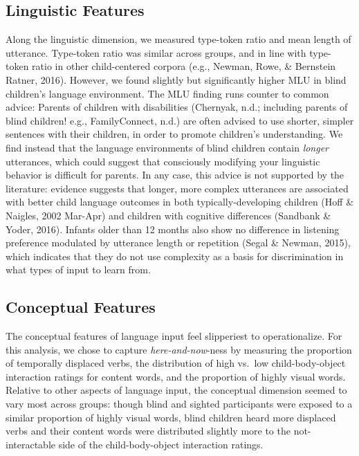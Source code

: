 \documentclass[
  man,floatsintext]{apa6}
\begin{document}
\hypertarget{linguistic-features-2}{%
\subsection{Linguistic Features}\label{linguistic-features-2}}

Along the linguistic dimension, we measured type-token ratio and mean length of utterance. Type-token ratio was similar across groups, and in line with type-token ratio in other child-centered corpora (e.g., Newman, Rowe, \& Bernstein Ratner, 2016). However, we found slightly but significantly higher MLU in blind children's language environment. The MLU finding runs counter to common advice: Parents of children with disabilities (Chernyak, n.d.; including parents of blind children! e.g., FamilyConnect, n.d.) are often advised to use shorter, simpler sentences with their children, in order to promote children's understanding. We find instead that the language environments of blind children contain \emph{longer} utterances, which could suggest that consciously modifying your linguistic behavior is difficult for parents. In any case, this advice is not supported by the literature: evidence suggests that longer, more complex utterances are associated with better child language outcomes in both typically-developing children (Hoff \& Naigles, 2002 Mar-Apr) and children with cognitive differences (Sandbank \& Yoder, 2016). Infants older than 12 months also show no difference in listening preference modulated by utterance length or repetition (Segal \& Newman, 2015), which indicates that they do not use complexity as a basis for discrimination in what types of input to learn from.

\hypertarget{conceptual-features-2}{%
\subsection{Conceptual Features}\label{conceptual-features-2}}

The conceptual features of language input feel slipperiest to operationalize. For this analysis, we chose to capture \emph{here-and-now}-ness by measuring the proportion of temporally displaced verbs, the distribution of high vs.~low child-body-object interaction ratings for content words, and the proportion of highly visual words. Relative to other aspects of language input, the conceptual dimension seemed to vary most across groups: though blind and sighted participants were exposed to a similar proportion of highly visual words, blind children heard more displaced verbs and their content words were distributed slightly more to the not-interactable side of the child-body-object interaction ratings.
\end{document}
